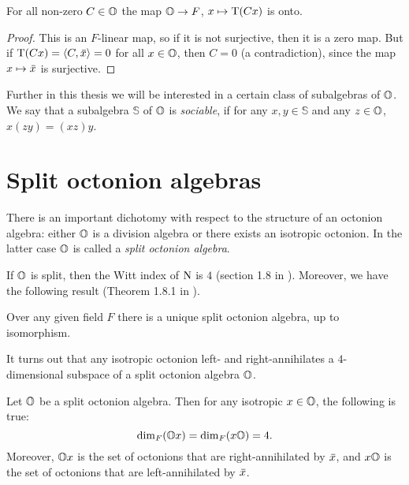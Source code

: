 \begin{lemma}
	For all non-zero $C \in \mathbb{O}$ the map $\mathbb{O} \rightarrow F$, $x \mapsto \operatorname{T}(Cx)$ is onto.
\end{lemma}

\begin{proof}
	This is an $F$-linear map, so if it is not surjective, then it is a zero map. But if 
	$\operatorname{T}(Cx) = \langle C, \mathord{\mbox{\hspace*{0pt}}\,\overline{\!x\!\!\;}\!\:}\mbox{\hspace*{0pt}} \rangle = 0$ for all $x \in \mathbb{O}$, then $C = 0$ (a contradiction), since the
	map $x \mapsto \mathord{\mbox{\hspace*{0pt}}\,\overline{\!x\!\!\;}\!\:}\mbox{\hspace*{0pt}}$ is surjective. 
\end{proof}

Further in this thesis we will be interested in a certain class of subalgebras of $\mathbb{O}$. We say
that a subalgebra $\mathbb{S}$ of $\mathbb{O}$ is \textit{sociable}, if for any $x,y \in \mathbb{S}$
and any $z \in \mathbb{O}$, $x(zy) = (xz)y$. 

\section{Split octonion algebras}

There is an important dichotomy with respect to the structure of an octonion algebra: 
either $\mathbb{O}$ is a division algebra or there exists an isotropic octonion.
In the latter case $\mathbb{O}$ is called a \textit{split octonion algebra}. 

If $\mathbb{O}$ is split, then the Witt index of $\mathord{\mathrm{N}}$ is $4$ (section 1.8 in \cite{SpringerVeldkamp}).
Moreover, we have the following result (Theorem 1.8.1 in \cite{SpringerVeldkamp}).
\begin{theorem}
	\label{theorem:unique_split_algebra}
	Over any given field $F$ there is a unique split octonion algebra, up to isomorphism.
\end{theorem}
It turns out that any isotropic octonion left- and right-annihilates a $4$-dimensional subspace
of a split octonion algebra $\mathbb{O}$. 

\begin{proposition}
	\label{prop:octonion_annihilator}
	Let $\mathbb{O}$ be a split octonion algebra. Then for any isotropic $x \in \mathbb{O}$, the 
	following is true:
	\begin{equation}
		\dim_F(\mathbb{O} x) = \dim_F(x\mathbb{O}) = 4. 
	\end{equation}
	Moreover, $\mathbb{O} x$ is the set of octonions that are right-annihilated by $\mathord{\mbox{\hspace*{0pt}}\,\overline{\!x\!\!\;}\!\:}\mbox{\hspace*{0pt}}$, and
	$x \mathbb{O}$ is the set of octonions that are left-annihilated by $\mathord{\mbox{\hspace*{0pt}}\,\overline{\!x\!\!\;}\!\:}\mbox{\hspace*{0pt}}$.
\end{proposition}

